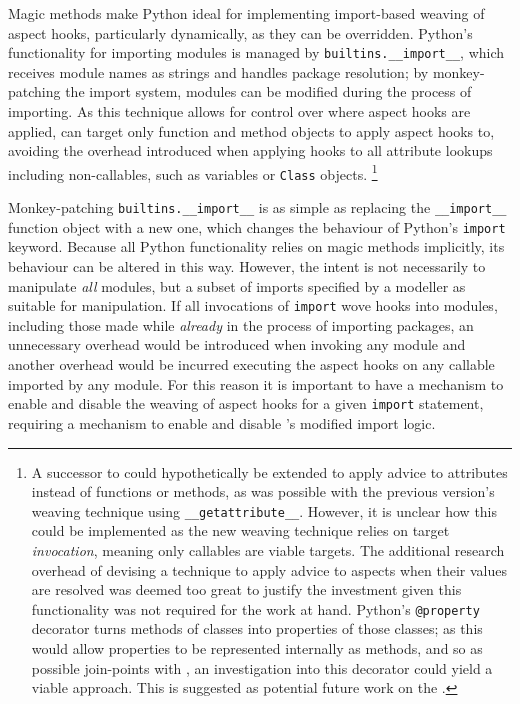 Magic methods make Python ideal for implementing import-based weaving of aspect
hooks, particularly dynamically, as they can be overridden. Python's
functionality for importing modules is managed by
\lstinline{builtins.__import__}, which receives module names as strings and
handles package resolution; by monkey-patching the import system, modules can be
modified during the process of importing. As this technique allows for control
over where aspect hooks are applied, \pdsfthree can target only function and method
objects to apply aspect hooks to, avoiding the overhead \pydysofu
introduced when applying hooks to all attribute lookups including non-callables,
such as variables or \lstinline{Class} objects. \footnote{A successor to
\pdsfthree{} could hypothetically be extended to apply advice to attributes instead
of functions or methods, as was possible with the previous version's weaving
technique using \lstinline{__getattribute__}. However, it is unclear how this
could be implemented as the new weaving technique relies on target
\emph{invocation}, meaning only callables are viable targets. The additional
research overhead of devising a technique to apply advice to aspects when their
values are resolved was deemed too great to justify the investment given this
functionality was not required for the work at hand. Python's
\lstinline{@property} decorator turns methods of classes into properties of
those classes; as this would allow properties to be represented internally as
methods, and so as possible join-points with \pdsfthree{}, an
investigation into this decorator could yield a viable approach. This is
suggested as potential future work on the \pdsfthree{}.}

Monkey-patching \lstinline{builtins.__import__} is as simple as replacing the
\lstinline{__import__} function object with a new one, which changes the
behaviour of Python's \lstinline{import} keyword. Because all Python
functionality relies on magic methods implicitly, its behaviour can be altered
in this way. However, the intent is not necessarily to manipulate \emph{all}
modules, but a subset of imports specified by a modeller as suitable for
manipulation. If all invocations of \lstinline{import} wove hooks into modules,
including those made while \emph{already} in the process of importing packages,
an unnecessary overhead would be introduced when invoking any module and another
overhead would be incurred executing the aspect hooks on any callable imported
by any module. For this reason it is important to have a mechanism to enable and
disable the weaving of aspect hooks for a given \lstinline{import} statement,
requiring a mechanism to enable and disable \pdsfthree{}'s modified import logic.

